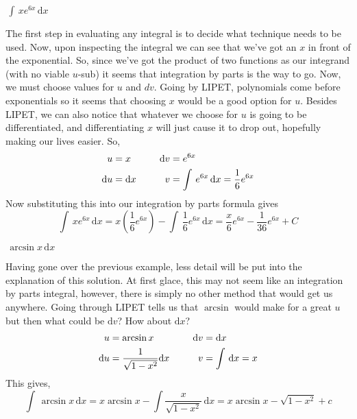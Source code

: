 \documentclass[addpoints]{exam}
\theoremstyle{definition}
\theoremstyle{plain}
\begin{document}
\begin{questions}
    \question $\displaystyle\,\int\,xe^{6x}\,\mathrm{d}x$
    \begin{solution}[\stretch{1}]
        The first step in evaluating any integral is to decide what technique needs to be used. Now, upon inspecting the integral we can see that we've got an $x$ in front of the exponential. So, since we've got the product of two functions as our integrand (with no viable $u$-sub) it seems that integration by parts is the way to go. Now, we must choose values for $u$ and $dv$. Going by LIPET, polynomials come before exponentials so it seems that choosing $x$ would be a good option for $u$. Besides LIPET, we can also notice that whatever we choose for $u$ is going to be differentiated, and differentiating $x$ will just cause it to drop out, hopefully making our lives easier. So,
        \begin{align*}
            u &= x &\hspace{0.2in} \mathrm{d}v &= e^{6x} \\
            \mathrm{d}u &= \mathrm{d}x &\hspace{0.2in} v &= \int\,e^{6x}\,\mathrm{d}x = \frac{1}{6}e^{6x}
        \end{align*}
        Now substituting this into our integration by parts formula gives
        \[
            \int\,xe^{6x}\,\mathrm{d}x = x\left(\frac{1}{6}e^{6x}\right) - \int\,\frac{1}{6}e^{6x}\,\mathrm{d}x = \frac{x}{6}e^{6x} - \frac{1}{36}e^{6x} + C
        \]
    \end{solution}

    \question $\displaystyle\, \arcsin{x}\,\mathrm{d}x$
    \begin{solution}[\stretch{1}]
        Having gone over the previous example, less detail will be put into the explanation of this solution. At first glace, this may not seem like an integration by parts integral, however, there is simply no other method that would get us anywhere. Going through LIPET tells us that $\arcsin$ would make for a great $u$ but then what could be $\mathrm{d}v$? How about $\mathrm{d}x$?
        \begin{align*}
            u &= \arcsin{x} &\hspace{0.2in} \mathrm{d}v &= \mathrm{d}x \\
            \mathrm{d}u &= \frac{1}{\sqrt{1-x^2}}\mathrm{d}x &\hspace{0.2in} v &= \int\,\mathrm{d}x = x
        \end{align*}
        This gives,
        \[
            \int\,\arcsin{x}\,\mathrm{d}x = x\arcsin{x} - \int \frac{x}{\sqrt{1-x^2}}\,\mathrm{d}x = x\arcsin{x} - \sqrt{1-x^2} + c
        \]
    \end{solution}


\end{questions}
\end{document}
